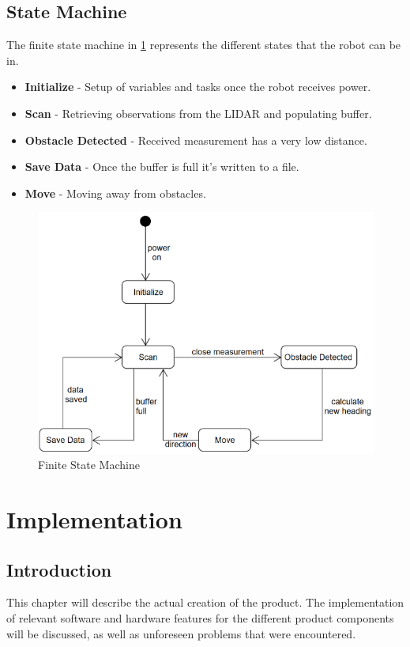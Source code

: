 		\section{State Machine}
		The finite state machine in \ref{fig:statemachine} represents the different states that the robot can be in.
		\begin{itemize}
			\item \textbf{Initialize} - Setup of variables and tasks once the robot receives power.
			\item \textbf{Scan} - Retrieving observations from the LIDAR and populating buffer.
			\item \textbf{Obstacle Detected} - Received measurement has a very low distance.
			\item \textbf{Save Data} - Once the buffer is full it's written to a file.
			\item \textbf{Move} - Moving away from obstacles.
		\end{itemize}
		
		\begin{figure}[ht]
			\centering
			\includegraphics[width=.8\linewidth]{SYNTHESIS/statemachine.png}
			\caption{Finite State Machine}
			\label{fig:statemachine}
		\end{figure}
		
	\chapter{Implementation}
		\section{Introduction}
		This chapter will describe the actual creation of the product. The implementation of relevant software and hardware features for the different product components will be discussed, as well as unforeseen problems that were encountered.
		
